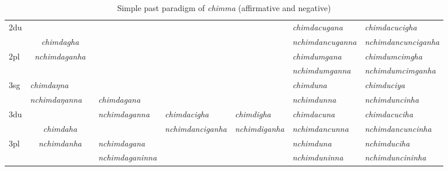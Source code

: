 \begin{landscape}
\begin{table}[p]
{{\begin{tabular}{|l||p{2.4cm}|p{2.0cm}|p{2.6cm}|p{2.6cm}|p{2.6cm}|p{3.2cm}|p{3.2cm}|}
 \cline{1-2} \cline{7-8}			
{\sc 2du}		& \multicolumn{2}{c|}{}     &  \multicolumn{3}{c|}{\cellcolor[gray]{.8}} & \it  chimdacugana  & \it   chimdacucigha \\
		&  	\multicolumn{2}{c|}{\it chimdagha} & \multicolumn{3}{c|}{ \cellcolor[gray]{.8}}& \it nchimdancuganna  & \it  nchimdancunciganha \\
 \cline{1-1} \cline{7-8}			
{\sc 2pl}		& 	\multicolumn{2}{c|}{\it nchimdaganha} &  \multicolumn{3}{c|}{ \cellcolor[gray]{.8}}& \it  chimdumgana& \it  chimdumcimgha  \\
		& \multicolumn{2}{c|}{ }&  \multicolumn{3}{c|}{\cellcolor[gray]{.8} }& \it  nchimdumganna & \it  nchimdumcimganha \\
\hline			
{\sc 3sg} 		& \it chimdaŋna	  & \it 	      	& \it   			& \it     & \it     	& \it chimduna& \it chimduciya\\
		& \it  nchimdaŋanna   & \it    	& \it  chimdagana	& \it   & \it    & \it nchimdunna& \it nchimduncinha\\
  \cline{1-2}  \cline{7-8}					
{\sc 3du}&   \multicolumn{2}{c|}{}& \it nchimdaganna& \it  chimdacigha& \it chimdigha& \it   chimdacuna & \it   chimdacuciha\\
	& \multicolumn{2}{c|}{\it chimdaha}& \it  & \it nchimdanciganha& \it  nchimdiganha & \it  nchimdancunna & \it  nchimdancuncinha\\
 \cline{1-1} \cline{4-4} \cline{7-8}	
{\sc 3pl} &  \multicolumn{2}{c|}{\it nchimdanha}	& \it nchimdagana& \it  & \it  & \it nchimduna& \it nchimduciha\\	
	& \multicolumn{2}{c|}{ }& \it nchimdaganinna& \it & \it  & \it nchimduninna& \it nchimduncininha \\
\hline
\end{tabular}
}
}
\caption{Simple past paradigm of \emph{chimma}  (affirmative and negative)}\label{par-chimd-pst}
\end{table}




\end{landscape}
